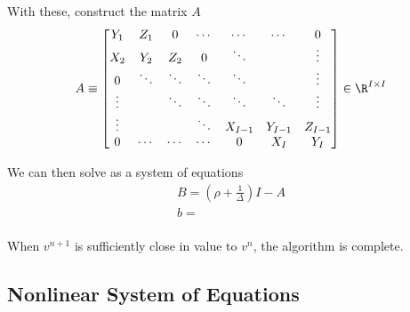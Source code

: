 \documentclass[11pt]{etk-article}
\begin{document}
With these, construct the matrix $A$
\begin{align}
A &\equiv \begin{bmatrix}
Y_1 & Z_1 & 0 & \cdots & \cdots & \cdots & 0 \\
X_2 & Y_2 & Z_2 & 0 & \ddots& & \vdots \\
0 & \ddots & \ddots & \ddots & \ddots &  & \vdots \\
\vdots & &\ddots & \ddots & \ddots & \ddots  & \vdots \\
\vdots & & & \ddots & X_{I-1} & Y_{I-1}  & Z_{I-1} \\
0 & \cdots & \cdots & \cdots & 0 & X_I & Y_I\\
\end{bmatrix}\in\R^{I\times I}\label{eq:A}\\
\end{align}


We can then solve as a system of equations 
\begin{align}
B = (\rho + \frac{1}{\Delta})I - A\\
b =\\
\end{align}


When $v^{n+1}$ is sufficiently close in value to $v^n$, the algorithm is complete. 



\subsection{Nonlinear System of Equations}


\end{document}
